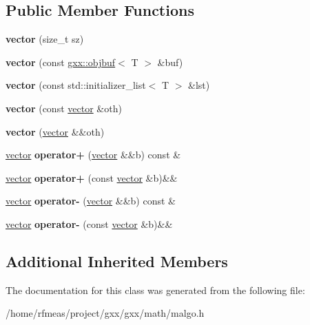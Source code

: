 \subsection*{Public Member Functions}
\begin{DoxyCompactItemize}
\item 
{\bfseries vector} (size\+\_\+t sz)\hypertarget{classmalgo_1_1vector_ad9ebe4b65d1c6a2f4d47acdb68242b48}{}\label{classmalgo_1_1vector_ad9ebe4b65d1c6a2f4d47acdb68242b48}

\item 
{\bfseries vector} (const \hyperlink{classgxx_1_1object__buffer}{gxx\+::objbuf}$<$ T $>$ \&buf)\hypertarget{classmalgo_1_1vector_a71203b7d969ef122eb30ae4f9287d5d4}{}\label{classmalgo_1_1vector_a71203b7d969ef122eb30ae4f9287d5d4}

\item 
{\bfseries vector} (const std\+::initializer\+\_\+list$<$ T $>$ \&lst)\hypertarget{classmalgo_1_1vector_a8fc0bbf6213b321ad4859747abbd843e}{}\label{classmalgo_1_1vector_a8fc0bbf6213b321ad4859747abbd843e}

\item 
{\bfseries vector} (const \hyperlink{classmalgo_1_1vector}{vector} \&oth)\hypertarget{classmalgo_1_1vector_ae77b60fcf60719ab2b0c72589626a2e3}{}\label{classmalgo_1_1vector_ae77b60fcf60719ab2b0c72589626a2e3}

\item 
{\bfseries vector} (\hyperlink{classmalgo_1_1vector}{vector} \&\&oth)\hypertarget{classmalgo_1_1vector_a85fe95e028701bf3b81d6c1c99bd4f52}{}\label{classmalgo_1_1vector_a85fe95e028701bf3b81d6c1c99bd4f52}

\item 
\hyperlink{classmalgo_1_1vector}{vector} {\bfseries operator+} (\hyperlink{classmalgo_1_1vector}{vector} \&\&b) const \&\hypertarget{classmalgo_1_1vector_aa021ae39e3f03c0a11b2426ea827794c}{}\label{classmalgo_1_1vector_aa021ae39e3f03c0a11b2426ea827794c}

\item 
\hyperlink{classmalgo_1_1vector}{vector} {\bfseries operator+} (const \hyperlink{classmalgo_1_1vector}{vector} \&b)\&\&\hypertarget{classmalgo_1_1vector_a625b2ac477dbb6c1c2145f3ae05d8c57}{}\label{classmalgo_1_1vector_a625b2ac477dbb6c1c2145f3ae05d8c57}

\item 
\hyperlink{classmalgo_1_1vector}{vector} {\bfseries operator-\/} (\hyperlink{classmalgo_1_1vector}{vector} \&\&b) const \&\hypertarget{classmalgo_1_1vector_ab8227ae40f3d59d72c4872997400c4ba}{}\label{classmalgo_1_1vector_ab8227ae40f3d59d72c4872997400c4ba}

\item 
\hyperlink{classmalgo_1_1vector}{vector} {\bfseries operator-\/} (const \hyperlink{classmalgo_1_1vector}{vector} \&b)\&\&\hypertarget{classmalgo_1_1vector_aa711189daa421fc0d9f9bbda23ba2e59}{}\label{classmalgo_1_1vector_aa711189daa421fc0d9f9bbda23ba2e59}

\end{DoxyCompactItemize}
\subsection*{Additional Inherited Members}


The documentation for this class was generated from the following file\+:\begin{DoxyCompactItemize}
\item 
/home/rfmeas/project/gxx/gxx/math/malgo.\+h\end{DoxyCompactItemize}

